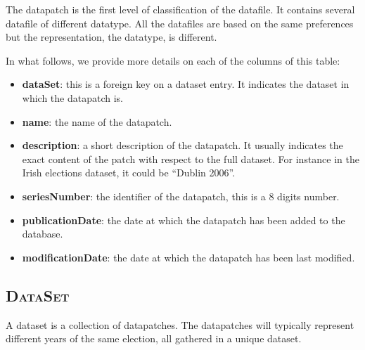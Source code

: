 \documentclass{report}
\begin{document}
	The datapatch is the first level of classification of the datafile. It contains several datafile of different datatype. All the datafiles are based on the same preferences but the representation, the datatype, is different.
	
	In what follows, we provide more details on each of the columns of this table:
	\begin{itemize}
		\item \textbf{dataSet}: this is a foreign key on a dataset entry. It indicates the dataset in which the datapatch is.
		\item \textbf{name}: the name of the datapatch.
		\item \textbf{description}: a short description of the datapatch. It usually indicates the exact content of the patch with respect to the full dataset. For instance in the Irish elections dataset, it could be ``Dublin 2006''.
		\item \textbf{seriesNumber}: the identifier of the datapatch, this is a 8 digits number.
		\item \textbf{publicationDate}: the date at which the datapatch has been added to the database.
		\item \textbf{modificationDate}: the date at which the datapatch has been last modified.
	\end{itemize}
	
	\subsection*{\faDatabase{} \textsc{DataSet}}
	
	A dataset is a collection of datapatches. The datapatches will typically represent different years of the same election, all gathered in a unique dataset.
	
\end{document}
